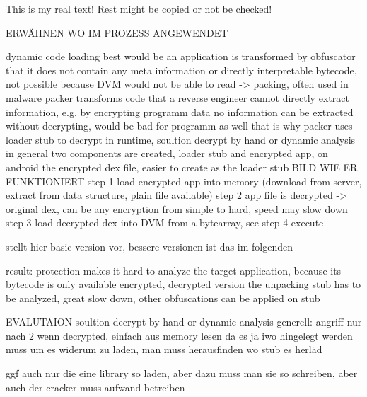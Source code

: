 This is my real text! Rest might be copied or not be checked!

ERWÄHNEN WO IM PROZESS ANGEWENDET\newline


%
dynamic code loading
best would be an application is transformed by obfuscator that it does not contain any meta information or directly interpretable bytecode, not possible because DVM would not be able to read -> packing, often used in malware \cite{packerProblemSolution}\newline
packer transforms code that a reverse engineer cannot directly extract information, e.g. by encrypting programm data no information can be extracted without decrypting, would be bad for programm as well that is why packer uses loader stub to decrypt in runtime, soultion decrypt by hand or dynamic analysis\newline
in general two components are created, loader stub and encrypted app, on android the encrypted dex file, easier to create as the loader stub\newline
BILD WIE ER FUNKTIONIERT
step 1 load encrypted app into memory (download from server, extract from data structure, plain file available)
step 2 app file is decrypted -> original dex, can be any encryption from simple to hard, speed may slow down
step 3 load decrypted dex into DVM from a bytearray, see \cite{schulzCodeProtection}
step 4 execute\newline

\cite{schulzCodeProtection} stellt hier basic version vor, bessere versionen ist das im folgenden

result: protection makes it hard to analyze the target application, because its bytecode is only available encrypted, decrypted version the unpacking stub has to be analyzed, great slow down, other obfuscations can be applied on stub
%

%
EVALUTAION\newline
soultion decrypt by hand or dynamic analysis\newline
generell: angriff nur nach 2 wenn decrypted, einfach aus memory lesen da es ja iwo hingelegt werden muss um es widerum zu laden, man muss herausfinden wo stub es herläd\newline

ggf auch nur die eine library so laden, aber dazu muss man sie so schreiben, aber auch der cracker muss aufwand betreiben\newline

